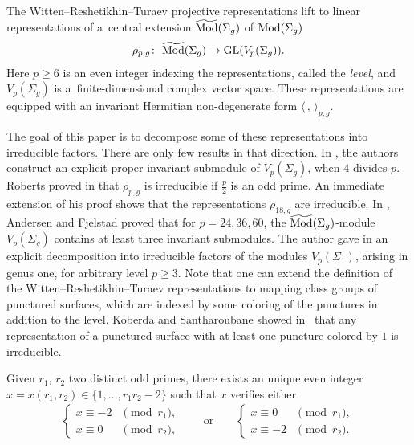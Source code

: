 \documentclass[pdftex]{sigma}
\numberwithin{equation}{section}
\begin{document}
The Witten--Reshetikhin--Turaev projective representations lift to linear representations of a~central extension $\widetilde{\operatorname{Mod}}(\Sigma_g)$ of $\operatorname{Mod}(\Sigma_g)$
\begin{gather*} \rho_{p,g}\colon \ \widetilde{\operatorname{Mod}}(\Sigma_g) \rightarrow \operatorname{GL}(V_p(\Sigma_g)).\end{gather*}
Here $p\geq 6$ is an even integer indexing the representations, called the \textit{level}, and $V_p(\Sigma_g)$ is a~finite-dimensional complex vector space. These representations are equipped with an invariant Hermitian non-degenerate form $\langle \, ,\, \rangle_{p,g}$.

The goal of this paper is to decompose some of these representations into irreducible factors. There are only few results in that direction. In \cite{BHMV2}, the authors construct an explicit proper invariant submodule of $V_p(\Sigma_g)$, when $4$ divides $p$. Roberts proved in \cite{Ro} that $\rho_{p,g}$ is irreducible if $\frac{p}{2}$ is an odd prime. An immediate extension of his proof shows that the representations $\rho_{18,g}$ are irreducible. In \cite{AF}, Andersen and Fjelstad proved that for $p=24,36,60$, the $\widetilde{\operatorname{Mod}}(\Sigma_g)$-module $V_p(\Sigma_g)$ contains at least three invariant submodules. The author gave in \cite{Koju1} an explicit decomposition into irreducible factors of the modules $V_p(\Sigma_1)$, arising in genus one, for arbitrary level $p\geq 3$. Note that one can extend the definition of the Witten--Reshetikhin--Turaev representations to mapping class groups of punctured surfaces, which are indexed by some coloring of the punctures in addition to the level. Koberda and Santharoubane showed in~\cite{KoberdaSantharoubane17} that any representation of a punctured surface with at least one puncture colored by $1$ is irreducible.

Given $r_1$, $r_2$ two distinct odd primes, there exists an unique even integer $x=x(r_1,r_2)\in \{ 1, \ldots, r_1r_2-2\}$ such that $x$ verifies either
\begin{gather*} \begin{cases}
x\equiv -2 &\pmod{r_1}, \\
x\equiv 0 & \pmod{r_2},
\end{cases} \qquad \text{or}\qquad \begin{cases}
x\equiv 0 &\pmod{r_1}, \\
x\equiv -2 & \pmod{r_2}.
\end{cases}\end{gather*}
\end{document}
